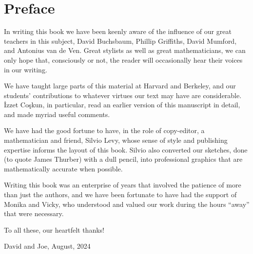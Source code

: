 
\chapter*{Preface}
\label{preface}


In writing this book we have been keenly aware of  the influence of 
our great teachers in this subject,
%
%
%
%
David Buchsbaum, Phillip Griffiths, David Mumford, and Antonius van de Ven. Great stylists
as well as great mathematicians, we can only hope that, consciously or not, the reader will occasionally hear their voices in our writing. 

We have taught large parts of this material at Harvard and Berkeley,
%
%
and our students' contributions to whatever virtues our text may have
are considerable. \.{I}zzet Co\c{s}kun, in particular, read an earlier
%
version of this manuscript in detail, and made myriad useful comments.

We have had the good fortune to have, in the
%
role of copy-editor, a mathematician and friend, Silvio Levy, whose sense of style and publishing expertise informs the
layout of this book. Silvio also converted our sketches, done (to quote James Thurber) with a dull
pencil, into professional graphics that are mathematically accurate when possible.

%
%
Writing this book was an enterprise of years that involved the
patience of more than just the authors, and we have been fortunate to
have had the support of Monika and Vicky, who understood and valued
our work during the hours ``away'' that were necessary.

To all these, our heartfelt thanks!

\baselineskip
David and Joe, August, 2024

